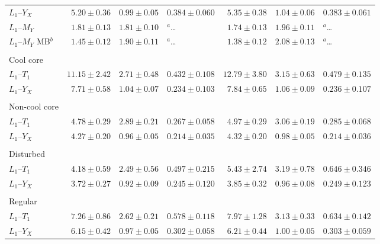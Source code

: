 \documentclass[oldversion]{aa}
\begin{document}
{\begin{table}[]
\begin{center}
\begin{tabular}{l r l l | r l l }
$L_1$--$Y_X$ & $5.20\pm0.36$ & $0.99\pm0.05$ & $0.384\pm0.060$ & 
				$5.35\pm0.38$ & $1.04\pm0.06$ & $0.383\pm0.061$ \\  

$L_1$--$M_Y$ & $1.81\pm0.13$ & $1.81\pm0.10$ & $^a$\ldots &
				$1.74\pm0.13$ & $1.96\pm 0.11$ & $^a$\ldots \\

$L_1$--$M_Y$ MB$^b$ & $1.45\pm0.12$ & $1.90\pm0.11$ & $^a$\ldots &
				$1.38\pm0.12$ & $2.08\pm 0.13$ & $^a$\ldots \\

\\
Cool core \\
\cline{1-1}
$L_1$--$T_1$ & $11.15\pm2.42$ & $2.71\pm0.48$ & $0.432\pm0.108$ & 
				$12.79\pm3.80$ & $3.15\pm0.63$ & $0.479\pm0.135$ \\

$L_1$--$Y_X$ &  $7.71\pm0.58$ & $1.04\pm0.07$ & $0.234\pm0.103$ & 
				$7.84\pm0.65$ & $1.06\pm0.09$ & $0.236\pm0.107$ \\

\\
Non-cool core \\
\cline{1-1} 
$L_1$--$T_1$ &  $4.78\pm0.29$ & $2.89\pm0.21$ & $0.267\pm0.058$ & 
				$4.97\pm0.29$ & $3.06\pm0.19$ & $0.285\pm0.068$ \\

$L_1$--$Y_X$ &  $4.27\pm0.20$ & $0.96\pm0.05$ & $0.214\pm0.035$ & 
				$4.32\pm0.20$ & $0.98\pm0.05$ & $0.214\pm0.036$ \\

\\

Disturbed \\
\cline{1-1} 
$L_1$--$T_1$ &  $4.18\pm0.59$ & $2.49\pm0.56$ & $0.497\pm0.215$ & 
				$5.43\pm2.74$ & $3.19\pm0.78$ & $0.646\pm0.346$ \\

$L_1$--$Y_X$ &  $3.72\pm0.27$ & $0.92\pm0.09$ & $0.245\pm0.120$ & 
				$3.85\pm0.32$ & $0.96\pm0.08$ & $0.249\pm0.123$ \\

\\
Regular \\
\cline{1-1}
$L_1$--$T_1$ &  $7.26\pm0.86$ & $2.62\pm0.21$ & $0.578\pm0.118$ & 
				$7.97\pm1.28$ & $3.13\pm0.33$ & $0.634\pm0.142$ \\

$L_1$--$Y_X$ &  $6.15\pm0.42$ & $0.97\pm0.05$ & $0.302\pm0.058$ & 
				$6.21\pm0.44$ & $1.00\pm0.05$ & $0.303\pm0.059$ \\


\end{tabular}
\end{center}
\end{table}}
\end{document}
